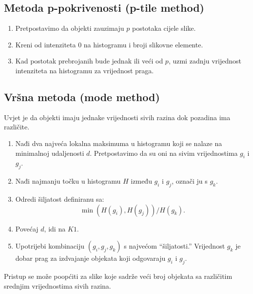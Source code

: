 \documentclass[11pt,english]{article}
\begin{document}
\subsection{Metoda p-pokrivenosti (p-tile method)}
\begin{enumerate}
  \item Pretpostavimo da objekti zauzimaju $p$ postotaka cijele slike.
  \item Kreni od intenziteta 0 na histogramu i broji slikovne elemente.
  \item Kad postotak prebrojanih bude jednak ili veći od $p$, uzmi zadnju vrijednost intenziteta na histogramu za vrijednost praga.
\end{enumerate}

\subsection{Vršna metoda (mode method)}
Uvjet je da objekti imaju jednake vrijednosti sivih razina dok pozadina ima različite.
\begin{enumerate}
  \item Nađi dva najveća lokalna maksimuma u histogramu koji se nalaze na minimalnoj udaljenosti $d$. Pretpostavimo da su oni na sivim vrijednostima $g_i$ i $g_j$.
  \item Nađi najmanju točku u histogramu $H$ između $g_i$ i $g_j$, označi ju s $g_k$.
  \item Odredi šiljatost definiranu sa:
  $$\min\left ( H(g_i), H(g_j) \right ) / H(g_k).$$
  \item Povećaj $d$, idi na $K1$.
  \item Upotrijebi kombinaciju $\left ( g_i, g_j, g_k \right )$ s najvećom ``šiljatosti.'' Vrijednost $g_k$ je dobar prag za izdvajanje objekata koji odgovaraju $g_i$ i $g_j$.
\end{enumerate}
Pristup se može poopćiti za slike koje sadrže veći broj objekata sa različitim srednjim vrijednostima sivih razina.
\end{document}
